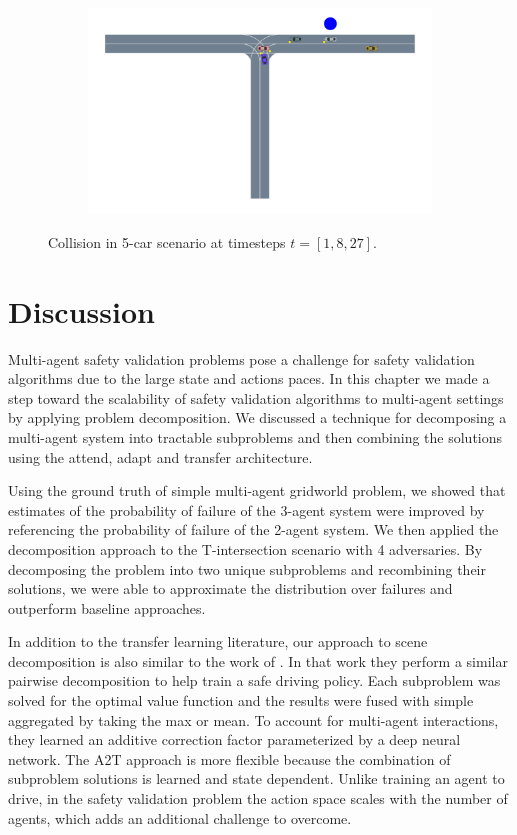 \begin{figure}
\begin{subfigure}[t]{0.7\textwidth}
    \includegraphics[width=\textwidth, trim={2cm 5cm 1cm 0},clip]{figures/problem_decomposition/f2_27.pdf}
\end{subfigure}
    \caption{Collision in 5-car scenario at timesteps $t=[1,8,27]$.}
    \label{fig:five_car_collision2}
    \vspace{-0.2in}
\end{figure}


\section{Discussion}

Multi-agent safety validation problems pose a challenge for safety validation algorithms due to the large state and actions paces. In this chapter we made a step toward the scalability of safety validation algorithms to multi-agent settings by applying problem decomposition. We discussed a technique for decomposing a multi-agent system into tractable subproblems and then combining the solutions using the attend, adapt and transfer architecture. 

Using the ground truth of simple multi-agent gridworld problem, we showed that estimates of the probability of failure of the \num{3}-agent system were improved by referencing the probability of failure of the \num{2}-agent system. We then applied the decomposition approach to the T-intersection scenario with \num{4} adversaries. By decomposing the problem into two unique subproblems and recombining their solutions, we were able to approximate the distribution over failures and outperform baseline approaches. 

In addition to the transfer learning literature, our approach to scene decomposition is also similar to the work of \textcite{bouton2019decomposition}. In that work they perform a similar pairwise decomposition to help train a safe driving policy. Each subproblem was solved for the optimal value function and the results were fused with simple aggregated by taking the max or mean. To account for multi-agent interactions, they learned an additive correction factor parameterized by a deep neural network. The A2T approach is more flexible because the combination of subproblem solutions is learned and state dependent. Unlike training an agent to drive, in the safety validation problem the action space scales with the number of agents, which adds an additional challenge to overcome.


